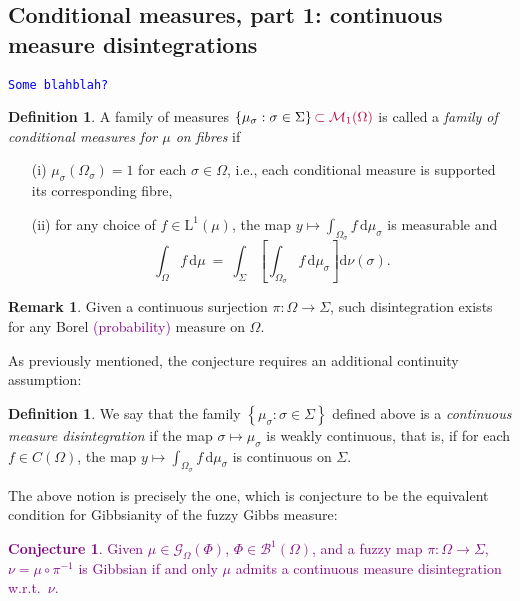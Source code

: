 \documentclass[12pt]{article}
\newcommand{\BB}{\mathscr{B}}
\renewcommand{\d}{\mathrm{d}}
\newcommand{\G}{\mathcal{G}}
\newcommand{\M}{\mathcal{M}}
\newcommand{\set}[1]{\left\{#1\right\}}
\newcommand{\oglati}[1]{\left[#1\right]}
\newcommand{\ra}{\rightarrow}
\newcommand{\1}{\mathbbm{1}}
\newcommand{\5}{\vspace{0.5cm}}
\theoremstyle{definition}
\newtheorem{df}[thm]{Definition}
\newtheorem{rem}[thm]{Remark}
\newtheorem{conj}[thm]{Conjecture}
\begin{document}

\subsection{Conditional measures, part 1: continuous measure disintegrations}

\textcolor{blue}{\texttt{Some blahblah?}}

\begin{df}
A family of measures $\set{\mu_\sigma:\sigma\in\Sigma}\textcolor{purple}{\subset\M_1(\Omega)}$ is called a \textit{family of conditional measures for $\mu$ on fibres} if
\begin{itemize}
	\item[(i)] $\mu_\sigma(\Omega_\sigma)=1$ for each $\sigma\in\Omega$, i.e., each conditional measure is supported its corresponding fibre,
	\item[(ii)] for any choice of $f\in\mathrm{L}^1(\mu)$, the map $y\mapsto\int_{\Omega_\sigma} f\,\d\mu_\sigma$ is measurable and
	$$\int_\Omega f\,\d\mu ~=~ \int_{\Sigma}\!\oglati{\int_{\Omega_\sigma} f\,\d\mu_\sigma}\!\d\nu(\sigma).$$
\end{itemize}
\end{df}

\begin{rem}
Given a continuous surjection $\pi:\Omega\ra\Sigma$, such disintegration exists for any Borel \textcolor{purple}{(probability)} measure on $\Omega$.
\end{rem}

As previously mentioned, the conjecture requires an additional continuity assumption:

\begin{df}
We say that the family $\set{\mu_\sigma:\sigma\in\Sigma}$ defined above is a \textit{continuous measure disintegration} if the map $\sigma\mapsto\mu_\sigma$ is weakly continuous, that is, if for each $f\in C(\Omega)$, the map $y\mapsto\int_{\Omega_\sigma}f\,\d\mu_\sigma$ is continuous on $\Sigma$.
\end{df}

The above notion is precisely the one, which is conjecture to be the equivalent condition for Gibbsianity of the fuzzy Gibbs measure:
\textcolor{purple}{
\begin{conj}\label{vEFShypothesis}
Given $\mu\in\G_\Omega(\Phi)$, $\Phi\in\BB^1(\Omega)$, and a fuzzy map $\pi:\Omega\ra\Sigma$, $\nu=\mu\circ\pi^{-1}$ is Gibbsian if and only $\mu$ admits a continuous measure disintegration w.r.t.~$\nu$.
\end{conj}}
\end{document}
